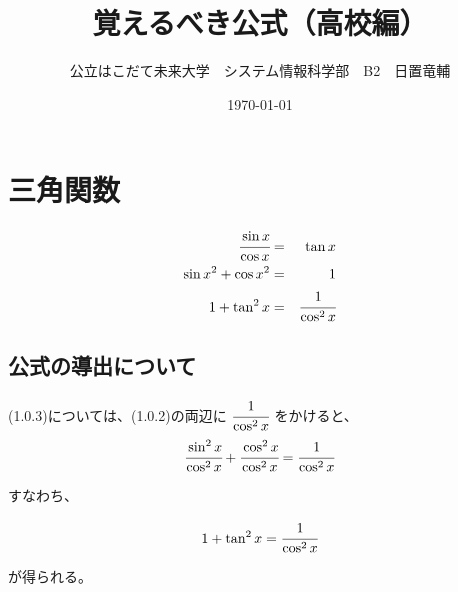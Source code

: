 \documentclass[dvipdfmx,uplatex]{jsarticle}
\title{覚えるべき公式（高校編）}
\author{公立はこだて未来大学　システム情報科学部　B2　日置竜輔}
\date{\today}
\begin{document}
\maketitle

\section{三角関数}

\begin{eqnarray}
  \cfrac{\sin x}{\cos x} & = & \tan x \\
  \sin x ^ 2 + \cos x ^ 2 & = & 1 \\
  1 + \tan ^ 2 x & = & \cfrac{1}{\cos ^ 2 x}
\end{eqnarray}

\subsection{公式の導出について}

(1.0.3)については、(1.0.2)の両辺に $ \cfrac{1}{\cos ^ 2 x} $ をかけると、
\begin{equation}
  \cfrac{\sin ^ 2 x}{\cos ^ 2 x} + \cfrac{\cos ^ 2 x}{\cos ^ 2 x} = \cfrac{1}{\cos ^ 2 x} \nonumber
\end{equation}

すなわち、

\begin{equation}
  1 + \tan ^ 2 x = \cfrac{1}{\cos ^ 2 x} \nonumber
\end{equation}

が得られる。
\end{document}

